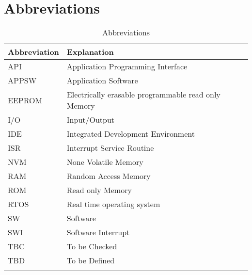 \chapter{Abbreviations}
\label{secAbbreviations}

\begin{longtable}[c]{|l|l|}
\hline
Abbreviation & Explanation
\\ \hline
API	    & Application Programming Interface                    \\ \hline
APPSW	  & Application Software                                 \\ \hline
EEPROM	& Electrically erasable programmable read only Memory  \\ \hline
I/O	    & Input/Output                                         \\ \hline
IDE	    & Integrated Development Environment                   \\ \hline
ISR	    & Interrupt Service Routine                            \\ \hline
NVM     & None Volatile Memory                                 \\ \hline
RAM	    & Random Access Memory                                 \\ \hline
ROM	    & Read only Memory                                     \\ \hline
RTOS    & Real time operating system                           \\ \hline
SW	    & Software                                             \\ \hline
SWI	    & Software Interrupt                                   \\ \hline
TBC	    & To be Checked                                        \\ \hline
TBD	    & To be Defined                                        \\ \hline
\caption{Abbreviations} \label{tabAbbrev}
\end{longtable}

